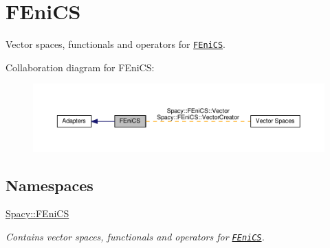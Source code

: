 \hypertarget{group__FenicsGroup}{\section{F\-Eni\-C\-S}
\label{group__FenicsGroup}
}


Vector spaces, functionals and operators for \href{http://www.fenicsproject.org}{\tt F\-Eni\-C\-S}.  


Collaboration diagram for F\-Eni\-C\-S\-:
\nopagebreak
\begin{figure}[H]
\begin{center}
\leavevmode
\includegraphics[width=350pt]{group__FenicsGroup}
\end{center}
\end{figure}
\subsection*{Namespaces}
\begin{DoxyCompactItemize}
\item 
\hyperlink{namespaceSpacy_1_1FEniCS}{Spacy\-::\-F\-Eni\-C\-S}
\begin{DoxyCompactList}\small\item\em Contains vector spaces, functionals and operators for \href{www.fenicsproject.org}{\tt F\-Eni\-C\-S}. \end{DoxyCompactList}\end{DoxyCompactItemize}
